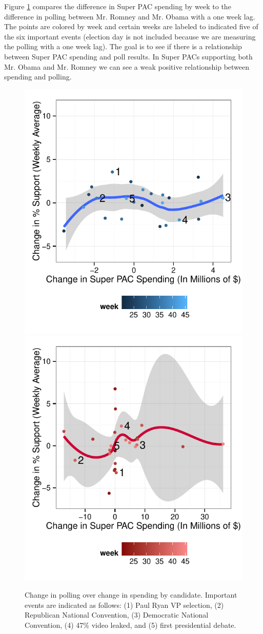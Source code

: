 \documentclass[11pt]{article}\usepackage{graphicx, color}
\newenvironment{knitrout}{}{} %
\begin{document}
Figure \ref{fig:support_spend} compares the difference in Super PAC spending by week to the difference in polling between Mr. Romney and Mr. Obama with a one week lag. The points are colored by week and certain weeks are labeled to indicated five of the six important events (election day is not included because we are measuring the polling with a one week lag). The goal is to see if there is a relationship between Super PAC spending and poll results. In Super PACs supporting both Mr. Obama and Mr. Romney we can see a weak positive relationship between spending and polling.

\begin{knitrout}
\color{fgcolor}\begin{figure}[H]


{\centering \includegraphics[width=.45\textwidth]{figure/support_spend1} 
\includegraphics[width=.45\textwidth]{figure/support_spend2} 

}

\caption[Change in polling over change in spending by candidate]{Change in polling over change in spending by candidate. Important events are indicated as follows: (1) Paul Ryan VP selection, (2) Republican National Convention, (3) Democratic National Convention, (4) 47\% video leaked, and (5) first presidential debate.\label{fig:support_spend}}
\end{figure}


\end{knitrout}
\end{document}
